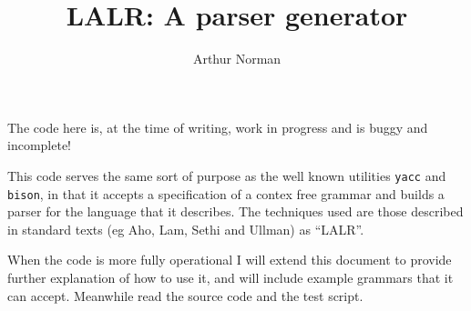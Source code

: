 \documentclass[12pt]{article}
\title{LALR: A parser generator}
\author{Arthur Norman}
\begin{document}
\maketitle

The code here is, at the time of writing, work in progress and
is buggy and incomplete!

This code serves the same sort of purpose as the well known utilities
\verb+yacc+ and \verb+bison+, in that it accepts a specification of a
contex free grammar and builds a parser for the language that it describes.
The techniques used are those described in standard texts (eg Aho, Lam,
Sethi and Ullman) as ``LALR''.

When the code is more fully operational I will extend this document to
provide further explanation of how to use it, and will include example
grammars that it can accept. Meanwhile read the source code and the
test script.
\end{document}
